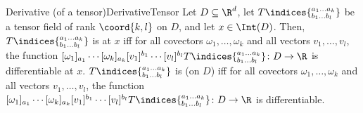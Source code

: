 \begin{dfn}{Derivative (of a tensor)}{DerivativeTensor}
Let $D\subseteq \R^d$, let $T\indices{^{a_1\dots a_k}_{b_1\dots b_l}}$ be a tensor field of rank $\coord{k,l}$ on $D$, and let $x\in \Int (D)$.  Then, $T\indices{^{a_1\ldots a_k}_{b_1\ldots b_l}}$ is  at $x$ iff for all covectors $\omega _1,\ldots ,\omega _k$ and all vectors $v_1,\ldots ,v_l$, the function $[\omega _1]_{a_1}\cdots [\omega _k]_{a_k}[v_1]^{b_1}\cdots [v_l]^{b_l}T\indices{^{a_1\dots a_k}_{b_1\dots b_l}}\colon D\rightarrow \R$ is differentiable at $x$.  $T\indices{^{a_1\dots a_k}_{b_1\dots b_l}}$ is  (on $D$) iff for all covectors $\omega _1,\ldots ,\omega _k$ and all vectors $v_1,\ldots ,v_l$, the function $[\omega _1]_{a_1}\cdots [\omega _k]_{a_k}[v_1]^{b_1}\cdots [v_l]^{b_l}T\indices{^{a_1\dots a_k}_{b_1\dots b_l}}\colon D\rightarrow \R$ is differentiable.
	

\end{dfn}
